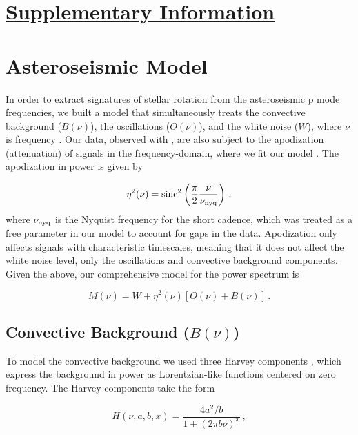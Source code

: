 \renewcommand{\figurename}{Supplementary Figure}


\section*{\underline{Supplementary Information}}
\tableofcontents

\section{Asteroseismic Model}\label{s:seismo}
In order to extract signatures of stellar rotation from the asteroseismic p mode frequencies, we built a model that simultaneously treats the convective background ($B(\nu)$), the oscillations ($O(\nu)$), and the white noise ($W$), where $\nu$ is frequency \cite{davies+2015}. Our data, observed with \kepler, are also subject to the apodization (attenuation) of signals in the frequency-domain, where we fit our model \cite{chaplin+2011}. The apodization in power is given by

\begin{equation}\label{eq:apodization}
	\eta^2(\nu) = \rm{sinc}^2\left(\frac{\pi}{2}\frac{\nu}{\nu_{\rm nyq}}\right)\, ,
\end{equation}
where $\nu_{\rm nyq}$ is the Nyquist frequency for the \kepler short cadence, which was treated as a free parameter in our model to account for gaps in the data. Apodization only affects signals with characteristic timescales, meaning that it does not affect the white noise level, only the oscillations and convective background components. Given the above, our comprehensive model for the power spectrum is

\begin{equation}\label{eq:model}
	M(\nu) = W + \eta^2(\nu)[O(\nu) + B(\nu)]\, .
\end{equation}

\subsection{Convective Background ($B(\nu)$)}
To model the convective background we used three Harvey components \cite{harvey1985}, which express the background in power as Lorentzian-like functions centered on zero frequency. The Harvey components take the form 

\begin{equation}
	H(\nu, a, b, x) = \frac{4a^2/b}{1 + (2\pi b\nu)^x}\, ,
\end{equation}

